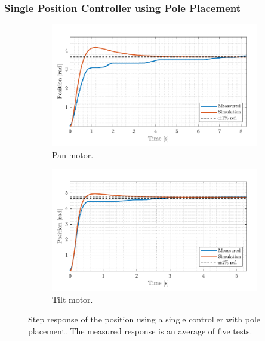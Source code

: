 \documentclass[../../main.tex]{subfiles}
\begin{document}
\subsubsection*{Single Position Controller using Pole Placement}

\begin{figure}[h]
     \centering
     \begin{subfigure}[b]{0.49\textwidth}
         \centering
         \includegraphics[width=\textwidth]{Sections/Test/Images/PoscontrollerTestPan.pdf}
         \caption{Pan motor.}
         \label{fig:StepPanPos}
     \end{subfigure}
     \hfill
     \begin{subfigure}[b]{0.49\textwidth}
         \centering
         \includegraphics[width=\textwidth]{Sections/Test/Images/PoscontrollerTestTilt.pdf}
         \caption{Tilt motor.}
         \label{fig:StepTiltPos}
     \end{subfigure}
        \caption{Step response of the position using a single controller with pole placement. The measured response is an average of five tests.}
        \label{fig:singlePosController}
\end{figure}
\end{document}
